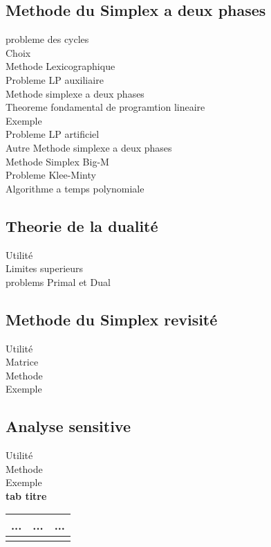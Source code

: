 \documentclass[5pt]{article}
\begin{document}
\begin{scriptsize}
\subsection{Methode du Simplex a deux phases}
probleme des cycles\\
Choix\\
Methode Lexicographique\\
Probleme LP auxiliaire\\
Methode simplexe a deux phases\\
Theoreme fondamental de programtion lineaire\\
Exemple\\
Probleme LP artificiel\\
Autre Methode simplexe a deux phases\\
Methode Simplex Big-M\\
Probleme Klee-Minty\\
Algorithme a temps polynomiale\\
\subsection{Theorie de la dualité}
Utilité\\
Limites superieurs\\
problems Primal et Dual 
\subsection{Methode du Simplex revisité}
Utilité\\
Matrice\\
Methode\\
Exemple\\
\subsection{Analyse sensitive}
Utilité\\
Methode\\
Exemple\\
\textbf{tab titre}  \\
\noindent
\begin{tabularx}{\linewidth}{|Y|Y|Y|}
\hline
... & ... & ...\\ \hline
\\ \hline
\end{tabularx} 
\end{scriptsize}
\end{document}
